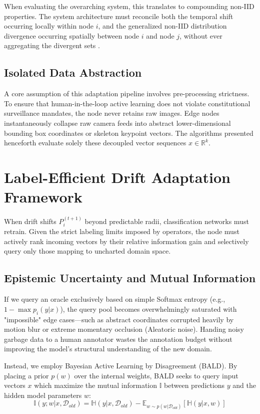\documentclass[conference]{IEEEtran}
\begin{document}
When evaluating the overarching system, this translates to compounding non-IID properties. The system architecture must reconcile both the temporal shift occurring locally within node $i$, and the generalized non-IID distribution divergence occurring spatially between node $i$ and node $j$, without ever aggregating the divergent sets \cite{b29}.

\subsection{Isolated Data Abstraction}
A core assumption of this adaptation pipeline involves pre-processing strictness. To ensure that human-in-the-loop active learning does not violate constitutional surveillance mandates, the node never retains raw images. Edge nodes instantaneously collapse raw camera feeds into abstract lower-dimensional bounding box coordinates or skeleton keypoint vectors. The algorithms presented henceforth evaluate solely these decoupled vector sequences $x \in \mathbb{R}^k$.

\section{Label-Efficient Drift Adaptation Framework}

When drift shifts $P_i^{(t+1)}$ beyond predictable radii, classification networks must retrain. Given the strict labeling limits imposed by operators, the node must actively rank incoming vectors by their relative information gain and selectively query only those mapping to uncharted domain space.

\subsection{Epistemic Uncertainty and Mutual Information}
If we query an oracle exclusively based on simple Softmax entropy (e.g., $1 - \max p_i(y|x)$), the query pool becomes overwhelmingly saturated with "impossible" edge cases—such as abstract coordinates corrupted heavily by motion blur or extreme momentary occlusion (Aleatoric noise). Handing noisy garbage data to a human annotator wastes the annotation budget without improving the model's structural understanding of the new domain.

Instead, we employ Bayesian Active Learning by Disagreement (BALD). By placing a prior $p(w)$ over the internal weights, BALD seeks to query input vectors $x$ which maximize the mutual information $\mathbb{I}$ between predictions $y$ and the hidden model parameters $w$:
\begin{equation}
\mathbb{I}(y; w | x, \mathcal{D}_{old}) = \mathbb{H}(y|x, \mathcal{D}_{old}) - \mathbb{E}_{w \sim p(w|\mathcal{D}_{old})}[\mathbb{H}(y|x, w)]
\end{equation}
\end{document}
